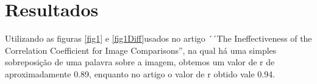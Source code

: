 \documentclass[10pt,a4paper]{article}
\begin{document}

\newpage
\section{Resultados}

Utilizando as figuras \ref{fig1} e \ref{fig1Diff}usados no artigo ´´The Ineffectiveness of the Correlation
Coefficient for Image Comparisons'', na qual há uma simples
sobreposição de uma palavra sobre a imagem, obtemos um valor de r de
aproximadamente 0.89, enquanto no artigo o valor de r obtido vale 0.94.

\begin{figure}[h!]
\begin{center}
\hspace{10mm}

\end{center}
\end{figure}
\end{document}

